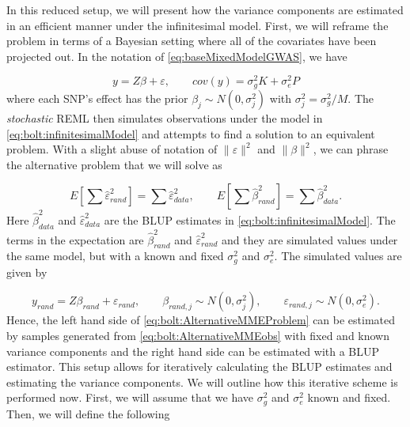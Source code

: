 In this reduced setup, we will present how the variance components are estimated in an efficient manner under the infinitesimal model. First, we will reframe the problem in terms of a Bayesian setting where all of the covariates have been projected out. In the notation of \cref{eq:baseMixedModelGWAS}, we have

\begin{equation}\label{eq:bolt:infinitesimalModel}
y = Z\beta + \varepsilon, \qquad cov(y) = \sigma_g^2 K + \sigma_e^2 P
\end{equation}
where each SNP's effect has the prior $ \beta_j \sim N(0, \sigma_j^2)$ with $\sigma_j^2 = \sigma_g^2 / M $. The \textit{stochastic} REML then simulates observations under the model in \cref{eq:bolt:infinitesimalModel} and attempts to find a solution to an equivalent problem. With a slight abuse of notation of $ \lVert \varepsilon \rVert^2$ and  $ \lVert \beta \rVert^2$, we can phrase the alternative problem that we will solve as

\begin{equation} \label{eq:bolt:AlternativeMMEProblem}
E\left[ \sum \hat{\varepsilon}^2_{rand} \right] = \sum \hat{\varepsilon}^2_{data}, \qquad E\left[ \sum \hat{\beta}^2_{rand} \right] = 
\sum \hat{\beta}^2_{data}.
\end{equation}
Here $ \hat{\beta}^2_{data} $ and $ \hat{\varepsilon}^2_{data} $ are the BLUP estimates in \cref{eq:bolt:infinitesimalModel}. The 
terms in the expectation are $ \hat{\beta}^2_{rand} $ and $ \hat{\varepsilon}^2_{rand} $ and they are simulated values under the same model, but with a known and fixed $ \sigma_g^2 $ and $ \sigma_e^2 $. The simulated values are given by

\begin{equation} \label{eq:bolt:AlternativeMMEobs}
y_{rand} = Z \beta_{rand} + \varepsilon_{rand}, \qquad \beta_{rand,j} \sim N(0, \sigma_j^2),  \qquad \varepsilon_{rand,j} \sim N(0, 
\sigma_e^2).
\end{equation} 
Hence, the left hand side of \cref{eq:bolt:AlternativeMMEProblem} can be estimated by samples generated from 
\cref{eq:bolt:AlternativeMMEobs} with fixed and known variance components and the right hand side can be estimated with a BLUP estimator. This setup allows for iteratively calculating the BLUP estimates and estimating the variance components. We will outline how this iterative scheme is performed now. First, we will assume that we have $ \sigma_g^2 $ and $ \sigma_e^2 $ known and fixed. Then, we will define the following 

